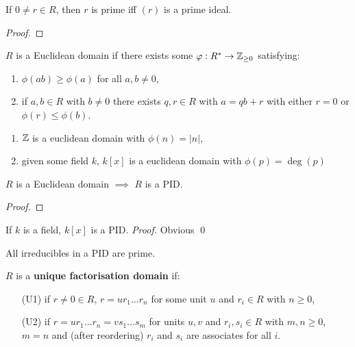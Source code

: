\documentclass{report}
\begin{document}
\begin{proposition}
    If $0\neq r\in R$, then $r$ is prime iff $(r)$ is a prime ideal.\begin{proof}
        
    \end{proof}
\end{proposition}

\begin{definition}
    $R$ is a Euclidean domain if there exists some  $\varphi:R^*\rightarrow\mathbb{Z}_{\geq0}$ satisfying: \begin{enumerate}
        \item $\phi(ab)\geq\phi(a)$ for all $a,b\neq 0$,
        \item if $a,b\in R$ with $b\neq 0$ there exists $q,r\in R$ with $a=qb+r$ with either $r=0$ or $\phi(r)\leq\phi(b)$.
    \end{enumerate}
\end{definition}

\begin{examples}
    \begin{enumerate}
        \item $\mathbb{Z}$ is a euclidean domain with $\phi(n)=|n|$,
        \item given some field $k$, $k[x]$ is a euclidean domain with $\phi(p)=\deg(p)$
    \end{enumerate}
\end{examples}

\begin{theorem}
    $R$ is a Euclidean domain $\implies$ $R$ is a PID.\begin{proof}
        
    \end{proof}
\end{theorem}

\begin{corollary}
    If $k$ is a field, $k[x]$ is a PID. \textit{Proof.} Obvious \qed
\end{corollary}

\begin{lemma}
    All irreducibles in a PID are prime.
\end{lemma}

\begin{definition}
    $R$ is a \textbf{unique factorisation domain} if: \begin{enumerate}
        \item[(U1)] if $r\neq0\in R$, $r=ur_1\ldots r_n$ for some unit $u$ and $r_i\in R$ with $n\geq0$,
        \item[(U2)] if $r=ur_1\ldots r_n=vs_1\ldots s_m$ for units $u,v$ and $r_i,s_i\in R$ with $m,n\geq 0$, $m=n$ and (after reordering) $r_i$ and $s_i$ are associates for all $i$.
    \end{enumerate}
\end{definition}
\end{document}
